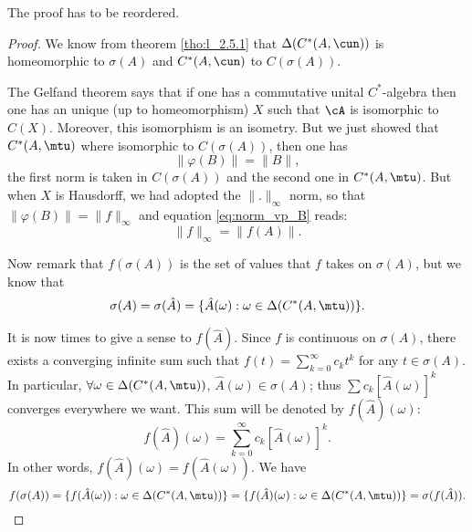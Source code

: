 \begin{probleme}
    The proof has to be reordered.
\end{probleme}

\begin{proof}
We know from theorem \ref{tho:l_2.5.1} that $\Delta(C^*(A,\cun))$ is homeomorphic to $\sigma(A)$ and $C^*(A,\cun)$ to $C(\sigma(A))$.

The Gelfand theorem says that if one has a commutative unital $C^{*}$-algebra then  one has an unique (up to homeomorphism) $X$ such that $\cA$ is isomorphic to $C(X)$. Moreover, this isomorphism is an isometry. But we just showed that $C^*(A,\mtu)$ where isomorphic to $C(\sigma(A))$, then one has
\begin{equation}\label{eq:norm_vp_B}
  \|\varphi(B)\|=\|B\|,
\end{equation}
the first norm is taken in $C(\sigma(A))$ and the second one in $C^*(A,\mtu)$. But when $X$ is Hausdorff, we had adopted the $\|.\|_{\infty}$ norm, so that $\|\varphi(B)\|=\|f\|_{\infty}$ and equation \eqref{eq:norm_vp_B} reads:
\begin{equation}
\|f\|_{\infty}=\|f(A)\|.
\end{equation}

Now remark that $f(\sigma(A))$ is the set of values that $f$ takes on $\sigma(A)$, but we know that
\[
\sigma(A)=\sigma(\hat A)=\{ \hat A(\omega):\omega\in\Delta(C^*(A,\mtu)) \}.
\]

It is now times to give a sense to $f(\hat{A})$.  Since $f$ is continuous on $\sigma(A)$, there exists a converging infinite sum such that $f(t)=\sum_{k=0}^{\infty}c_kt^k$ for any $t\in\sigma(A)$. In particular, $\forall\omega\in\Delta(C^*(A,\mtu))$, $\hat A(\omega)\in\sigma(A)$; thus 
   $\sum c_k[\hat A(\omega)]^k$ converges everywhere we want. This sum will be denoted by $f(\hat{A})(\omega)$: 
\begin{equation}
f(\hat A)(\omega)=\sum_{k=0}^{\infty}c_k[\hat A(\omega)]^k.
\end{equation}
In other words, $f(\hat A)(\omega)=f(\hat A(\omega))$. We have
\begin{equation}
   f(\sigma(A))=\{f(\hat A(\omega)):\omega\in\Delta( C^*(A,\mtu) )\}
               =\{ f(\hat A)(\omega):\omega\in\Delta( C^*(A,\mtu) ) \}
           =\sigma(f(\hat A)).
\end{equation}



\end{proof}
